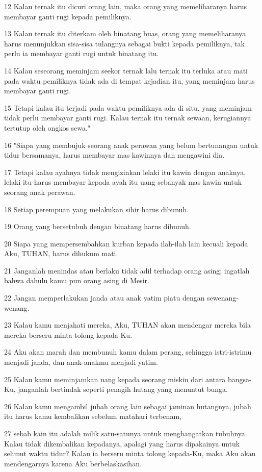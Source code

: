 \par 12 Kalau ternak itu dicuri orang lain, maka orang yang memeliharanya harus membayar ganti rugi kepada pemiliknya.
\par 13 Kalau ternak itu diterkam oleh binatang buas, orang yang memeliharanya harus menunjukkan sisa-sisa tulangnya sebagai bukti kepada pemiliknya, tak perlu ia membayar ganti rugi untuk binatang itu.
\par 14 Kalau seseorang meminjam seekor ternak lalu ternak itu terluka atau mati pada waktu pemiliknya tidak ada di tempat kejadian itu, yang meminjam harus membayar ganti rugi.
\par 15 Tetapi kalau itu terjadi pada waktu pemiliknya ada di situ, yang meminjam tidak perlu membayar ganti rugi. Kalau ternak itu ternak sewaan, kerugiannya tertutup oleh ongkos sewa."
\par 16 "Siapa yang membujuk seorang anak perawan yang belum bertunangan untuk tidur bersamanya, harus membayar mas kawinnya dan mengawini dia.
\par 17 Tetapi kalau ayahnya tidak mengizinkan lelaki itu kawin dengan anaknya, lelaki itu harus membayar kepada ayah itu uang sebanyak mas kawin untuk seorang anak perawan.
\par 18 Setiap perempuan yang melakukan sihir harus dibunuh.
\par 19 Orang yang bersetubuh dengan binatang harus dibunuh.
\par 20 Siapa yang mempersembahkan kurban kepada ilah-ilah lain kecuali kepada Aku, TUHAN, harus dihukum mati.
\par 21 Janganlah menindas atau berlaku tidak adil terhadap orang asing; ingatlah bahwa dahulu kamu pun orang asing di Mesir.
\par 22 Jangan memperlakukan janda atau anak yatim piatu dengan sewenang-wenang.
\par 23 Kalau kamu menjahati mereka, Aku, TUHAN akan mendengar mereka bila mereka berseru minta tolong kepada-Ku.
\par 24 Aku akan marah dan membunuh kamu dalam perang, sehingga istri-istrimu menjadi janda, dan anak-anakmu menjadi yatim.
\par 25 Kalau kamu meminjamkan uang kepada seorang miskin dari antara bangsa-Ku, janganlah bertindak seperti penagih hutang yang menuntut bunga.
\par 26 Kalau kamu mengambil jubah orang lain sebagai jaminan hutangnya, jubah itu harus kamu kembalikan sebelum matahari terbenam,
\par 27 sebab kain itu adalah milik satu-satunya untuk menghangatkan tubuhnya. Kalau tidak dikembalikan kepadanya, apalagi yang harus dipakainya untuk selimut waktu tidur? Kalau ia berseru minta tolong kepada-Ku, maka Aku akan mendengarnya karena Aku berbelaskasihan.
